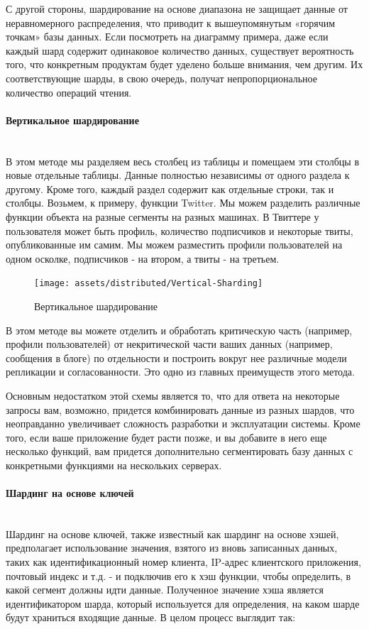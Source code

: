 С другой стороны, шардирование на основе диапазона не защищает данные от неравномерного распределения, что приводит к
вышеупомянутым «горячим точкам» базы данных. Если посмотреть на диаграмму примера, даже если каждый шард содержит
одинаковое количество данных, существует вероятность того, что конкретным продуктам будет уделено больше внимания, чем
другим. Их соответствующие шарды, в свою очередь, получат непропорциональное количество операций чтения. \autocite{DatabaseSharding}

\paragraph{Вертикальное шардирование} ~\\
В этом методе мы разделяем весь столбец из таблицы и помещаем эти столбцы в новые отдельные таблицы. Данные полностью
независимы от одного раздела к другому. Кроме того, каждый раздел содержит как отдельные строки, так и столбцы. Возьмем,
к примеру, функции Twitter. Мы можем разделить различные функции объекта на разные сегменты на разных машинах. В
Твиттере у пользователя может быть профиль, количество подписчиков и некоторые твиты, опубликованные им самим. Мы можем
разместить профили пользователей на одном осколке, подписчиков - на втором, а твиты - на третьем.

\begin{figure}[H]
    \centering
    \texttt{[image: assets/distributed/Vertical-Sharding]}
    \caption{Вертикальное шардирование}
    \label{fig:Vertical-Sharding}
\end{figure}

В этом методе вы можете отделить и обработать критическую часть (например, профили пользователей) от некритической части
ваших данных (например, сообщения в блоге) по отдельности и построить вокруг нее различные модели репликации и
согласованности. Это одно из главных преимуществ этого метода.

Основным недостатком этой схемы является то, что для ответа на некоторые запросы вам, возможно, придется комбинировать
данные из разных шардов, что неоправданно увеличивает сложность разработки и эксплуатации системы. Кроме того, если
ваше приложение будет расти позже, и вы добавите в него еще несколько функций, вам придется дополнительно сегментировать
базу данных с конкретными функциями на нескольких серверах. \autocite{DatabaseSharding}

\paragraph{Шардинг на основе ключей} ~\\
Шардинг на основе ключей, также известный как шардинг на основе хэшей, предполагает использование значения, взятого из
вновь записанных данных, таких как идентификационный номер клиента, IP-адрес клиентского приложения, почтовый индекс и
т.д. - и подключив его к хэш функции, чтобы определить, в какой сегмент должны идти данные. Полученное значение хэша
является идентификатором шарда, который используется для определения, на каком шарде будут храниться входящие данные. В
целом процесс выглядит так:


